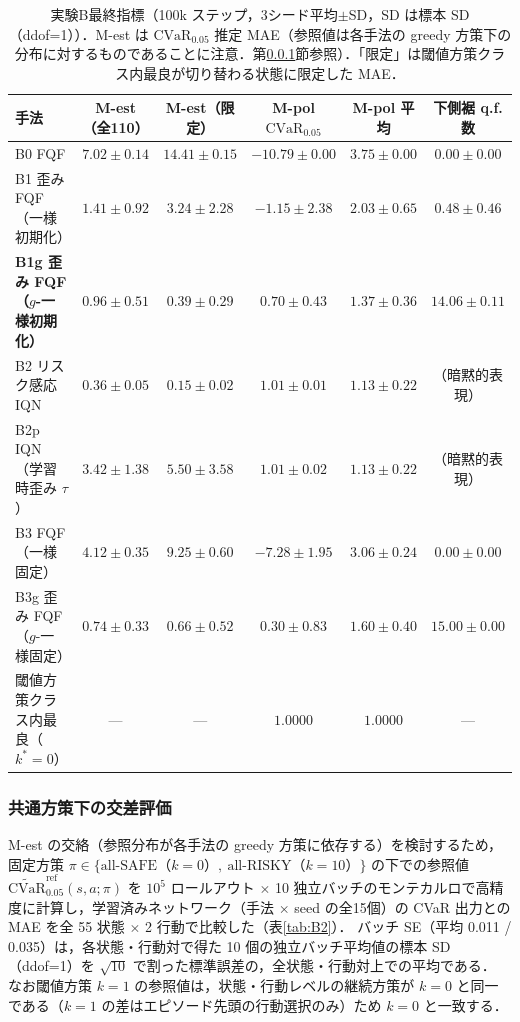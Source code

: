 \documentclass[a4paper,10pt]{jsarticle}
\theoremstyle{definition}
\newcommand{\CVaR}{\mathrm{CVaR}}
\begin{document}
\begin{table}[htbp]
\centering
\caption{実験B最終指標（100k ステップ，3シード平均$\pm$SD，SD は標本 SD（ddof=1））．M-est は $\CVaR_{0.05}$ 推定 MAE（参照値は各手法の greedy 方策下の分布に対するものであることに注意．第\ref{subsec:cross}節参照）．「限定」は閾値方策クラス内最良が切り替わる状態に限定した MAE．}
\label{tab:B1}
\small
\setlength{\tabcolsep}{2.5pt}
\begin{tabular}{lccccc}
\toprule
手法 & M-est（全110） & M-est（限定） & M-pol $\CVaR_{0.05}$ & M-pol 平均 & 下側裾 q.f. 数\\
\midrule
B0 FQF & $7.02\pm0.14$ & $14.41\pm0.15$ & $-10.79\pm0.00$ & $3.75\pm0.00$ & $0.00\pm0.00$\\
B1 歪み FQF（一様初期化） & $1.41\pm0.92$ & $3.24\pm2.28$ & $-1.15\pm2.38$ & $2.03\pm0.65$ & $0.48\pm0.46$\\
\textbf{B1g 歪み FQF（$g$-一様初期化）} & $\mathbf{0.96\pm0.51}$ & $\mathbf{0.39\pm0.29}$ & $\mathbf{0.70\pm0.43}$ & $1.37\pm0.36$ & $\mathbf{14.06\pm0.11}$\\
B2 リスク感応 IQN & $0.36\pm0.05$ & $0.15\pm0.02$ & $1.01\pm0.01$ & $1.13\pm0.22$ & （暗黙的表現）\\
B2p IQN（学習時歪み $\tau$） & $3.42\pm1.38$ & $5.50\pm3.58$ & $1.01\pm0.02$ & $1.13\pm0.22$ & （暗黙的表現）\\
\midrule
B3 FQF（一様固定） & $4.12\pm0.35$ & $9.25\pm0.60$ & $-7.28\pm1.95$ & $3.06\pm0.24$ & $0.00\pm0.00$\\
B3g 歪み FQF（$g$-一様固定） & $0.74\pm0.33$ & $0.66\pm0.52$ & $0.30\pm0.83$ & $1.60\pm0.40$ & $15.00\pm0.00$\\
\midrule
閾値方策クラス内最良（$k^*=0$） & --- & --- & $1.0000$ & $1.0000$ & ---\\
\bottomrule
\end{tabular}
\end{table}

\subsubsection{共通方策下の交差評価}
\label{subsec:cross}
M-est の交絡（参照分布が各手法の greedy 方策に依存する）を検討するため，固定方策 $\pi\in\{\text{all-SAFE}（k=0）,\ \text{all-RISKY}（k=10）\}$ の下での参照値 $\widetilde{\mathrm{CVaR}}_{0.05}^{\mathrm{ref}}(s,a;\pi)$ を $10^5$ ロールアウト $\times$ 10 独立バッチのモンテカルロで高精度に計算し，学習済みネットワーク（手法 $\times$ seed の全15個）の CVaR 出力との MAE を全 55 状態 $\times$ 2 行動で比較した（表\ref{tab:B2}）．
バッチ SE（平均 0.011 / 0.035）は，各状態・行動対で得た 10 個の独立バッチ平均値の標本 SD（ddof=1）を $\sqrt{10}$ で割った標準誤差の，全状態・行動対上での平均である．
なお閾値方策 $k=1$ の参照値は，状態・行動レベルの継続方策が $k=0$ と同一である（$k=1$ の差はエピソード先頭の行動選択のみ）ため $k=0$ と一致する．
\end{document}
